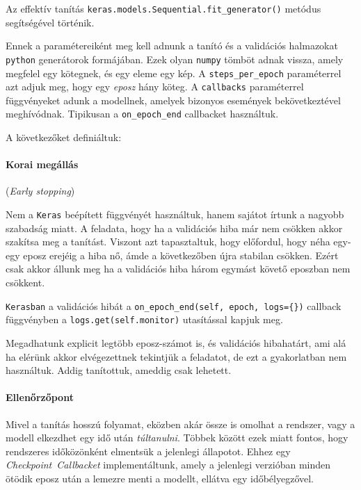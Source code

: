Az effektív tanítás \texttt{keras.models.Sequential.fit\_generator()} metódus segítségével 
történik.

Ennek a paramétereiként meg kell adnunk a tanító és a validációs halmazokat \texttt{python} 
generátorok formájában. Ezek olyan \texttt{numpy} tömböt adnak vissza, amely megfelel 
egy kötegnek, és egy eleme egy kép. A \texttt{steps\_per\_epoch} paraméterrel azt adjuk
meg, hogy egy \textit{eposz} hány köteg. A \texttt{callbacks} paraméterrel függvényeket
adunk a modellnek, amelyek bizonyos események bekövetkeztével meghívódnak. Tipikusan a
\texttt{on\_epoch\_end} callbacket használtuk.

\noindent
A következőket definiáltuk:

\paragraph{Korai megállás} (\textit{Early stopping})

Nem a \texttt{Keras} beépített függvényét használtuk, hanem sajátot írtunk a
nagyobb szabadság miatt. A feladata, hogy ha a validációs hiba már nem csökken akkor 
szakítsa meg a tanítást. Viszont azt tapasztaltuk, hogy előfordul, hogy néha
egy-egy eposz erejéig a hiba nő, ámde a következőben újra stabilan csökken.
Ezért csak akkor állunk meg ha a validációs hiba három egymást követő eposzban
nem csökkent.

\texttt{Kerasban} a validációs hibát a \texttt{on\_epoch\_end(self, epoch, logs=\{\})} 
callback függvényben a \texttt{logs.get(self.monitor)} utasítással kapjuk meg.

Megadhatunk explicit legtöbb eposz-számot is, és validációs hibahatárt, ami alá ha
elérünk akkor elvégezettnek tekintjük a feladatot, de ezt a gyakorlatban nem használtuk.
Addig tanítottuk, ameddig csak lehetett.

\paragraph{Ellenőrzőpont}

Mivel a tanítás hosszú folyamat, eközben akár össze is omolhat a rendszer, vagy
a modell elkezdhet egy idő után \textit{túltanulni}. Többek között ezek miatt fontos,
hogy rendszeres időközönként elmentsük a jelenlegi állapotot. Ehhez egy 
\textit{Checkpoint~Callbacket} implementáltunk, amely a jelenlegi verzióban minden ötödik
eposz után a lemezre menti a modellt, ellátva egy időbélyegzővel.



